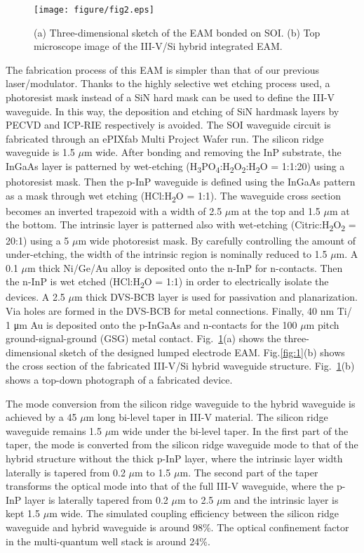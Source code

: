 \documentclass[aip,apl,reprint,a4paper]{revtex4-1}
\def\SB#1{\textsubscript{#1}}
\begin{document}
\begin{figure}
	\texttt{[image: figure/fig2.eps]}%
	\caption{\label{fig:2} (a) Three-dimensional sketch of the EAM bonded on SOI. (b) Top microscope image of the III-V/Si hybrid integrated EAM.}
\end{figure}


The fabrication process of this EAM is simpler than that of our previous laser/modulator.\cite{Transceiver,roelkensiii-v-on-silicon2015,fu52015} Thanks to the highly selective wet etching process used, a photoresist mask instead of a SiN hard mask can be used to define the III-V waveguide. In this way, the deposition and etching of SiN hardmask layers by PECVD and ICP-RIE respectively is avoided. The SOI waveguide circuit is fabricated through an ePIXfab Multi Project Wafer run.\cite{epixfab} The silicon ridge waveguide is 1.5 $\mu$m wide. After bonding and removing the InP substrate, the InGaAs layer is patterned by wet-etching (H\SB{3}PO\SB{4}:H\SB{2}O\SB{2}:H\SB{2}O = 1:1:20) using a photoresist mask. Then the p-InP waveguide is defined using the InGaAs pattern as a mask through wet etching (HCl:H\SB{2}O = 1:1). The waveguide cross section becomes an inverted trapezoid with a width of 2.5 $\mu$m at the top and 1.5 $\mu$m at the bottom. The intrinsic layer is patterned also with wet-etching (Citric:H\SB{2}O\SB{2} = 20:1) using a 5 $\mu$m wide photoresist mask.  By carefully controlling the amount of under-etching, the width of the intrinsic region is nominally reduced to 1.5 $\mu$m. A 0.1 $\mu$m thick Ni/Ge/Au alloy is deposited onto the n-InP for n-contacts. Then the n-InP is wet etched (HCl:H\SB{2}O = 1:1) in order to electrically isolate the devices. A 2.5 $\mu$m thick DVS-BCB layer is used for passivation and planarization. Via holes are formed in the DVS-BCB for metal connections. Finally, 40 nm Ti/ 1 μm Au is deposited onto the p-InGaAs and n-contacts for the 100 $\mu$m pitch ground-signal-ground (GSG) metal contact. Fig.~\ref{fig:2}(a) shows the three-dimensional sketch of the designed lumped electrode EAM. Fig.\ref{fig:1}(b) shows the cross section of the fabricated III-V/Si hybrid waveguide structure. Fig.~\ref{fig:2}(b) shows a top-down photograph of a fabricated device.


The mode conversion from the silicon ridge waveguide to the hybrid waveguide is achieved by a 45 $\mu$m long bi-level taper in III-V material.\cite{fu52015,huang2015ultracompact} The silicon ridge waveguide remains 1.5 $\mu$m wide under the bi-level taper. In the first part of the taper, the mode is converted from the silicon ridge waveguide mode to that of the hybrid structure without the thick p-InP layer, where the intrinsic layer width laterally is tapered from 0.2 $\mu$m to 1.5 $\mu$m. The second part of the taper transforms the optical mode into that of the full III-V waveguide, where the p-InP layer is laterally tapered from 0.2 $\mu$m to 2.5 $\mu$m and the intrinsic layer is kept 1.5 $\mu$m wide. The simulated coupling efficiency between the silicon ridge waveguide and hybrid waveguide is around 98\%. The optical confinement factor in the multi-quantum well stack is around 24\%.
\end{document}
